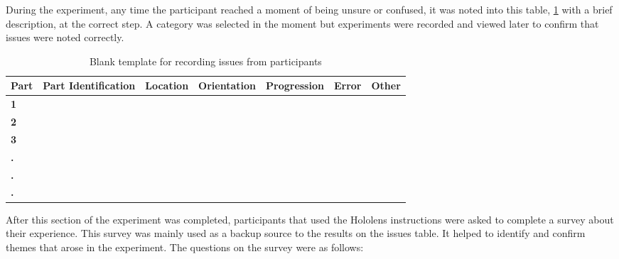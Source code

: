 \documentclass{l4proj}
\begin{document}
During the experiment, any time the participant reached a moment of being unsure or confused, it was noted into this table, \ref{tab:blankissues} with a brief description, at the correct step. A category was selected in the moment but experiments were recorded and viewed later to confirm that issues were noted correctly.
    \begin{table}[!ht]
         \caption{
         Blank template for recording issues from participants
         }\label{tab:blankissues}
        \centering
        \begin{tabular}{@{}l|llllll@{}}
            \textbf{Part} & \textbf{Part Identification} & \textbf{Location} & \textbf{Orientation} & \textbf{Progression}  & \textbf{Error} & \textbf{Other} \\ \hline
            \textbf{1}  & ~ & ~ & ~ & ~ & ~ & ~ \\ 
            \textbf{2}  & ~ & ~ & ~ & ~ & ~ & ~ \\ 
            \textbf{3}  & ~ & ~ & ~ & ~ & ~ & ~ \\ 
            \textbf{.}  & ~ & ~ & ~ & ~ & ~ & ~ \\ 
            \textbf{.}  & ~ & ~ & ~ & ~ & ~ & ~ \\ 
            \textbf{.}  & ~ & ~ & ~ & ~ & ~ & ~ \\ 
        \end{tabular}
    \end{table}

After this section of the experiment was completed, participants that used the Hololens instructions were asked to complete a survey about their experience. This survey was mainly used as a backup source to the results on the issues table. It helped to identify and confirm themes that arose in the experiment. The questions on the survey were as follows:
\end{document}
